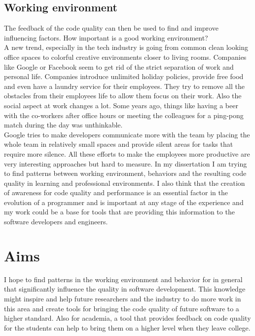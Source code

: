 \subsection{Working environment}
The feedback of the code quality can then be used to find and improve influencing factors. 
How important is a good working environment?\\
A new trend, especially in the tech industry is going from common clean looking office spaces to colorful creative environments closer to living rooms. Companies like Google or Facebook seem to get rid of the strict separation of work and personal life. Companies introduce unlimited holiday policies, provide free food and even have a laundry service for their employees. They try to remove all the obstacles from their employees life to allow them focus on their work. 
Also the social aspect at work changes a lot. Some years ago, things like having a beer with the co-workers after office hours or meeting the colleagues for a ping-pong match during the day was unthinkable.\\
Google tries to make developers communicate more with the team by placing the whole team in relatively small spaces and provide silent areas for tasks that require more silence. 
All these efforts to make the employees more productive are very interesting approaches but hard to measure. 
\bigbreak
In my dissertation I am trying to find patterns between working environment, behaviors and the resulting code quality in learning and professional environments. I also think that the creation of awareness for code quality and performance is an essential factor in the evolution of a programmer and is important at any stage of the experience and my work could be a base for tools that are providing this information to the software developers and engineers. 

\section{Aims}
I hope to find patterns in the working environment and behavior for in general that significantly influence the quality in software development.
This knowledge might inspire and help future researchers and the industry to do more work in this area and create tools for bringing the code quality of future software to a higher standard. 
Also for academia, a tool that provides feedback on code quality for the students can help to bring them on a higher level when they leave college. 


